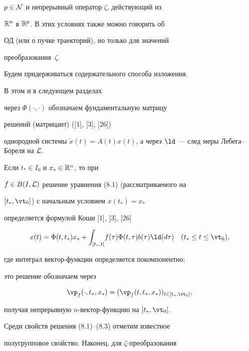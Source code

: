 $p \in {\cal N}$ и непрерывный оператор $\zeta$, действующий из


${\Bbb R}^n$ в ${{\Bbb R}^p}$. В этих условиях также можно говорить об


ОД (или о пучке траекторий), но только для значений


преобразования~$\zeta$.





Будем придерживаться содержательного способа изложения.


В этом и в следующем разделах


через ${\Phi}(\cdot,\cdot)$ обозначаем фундаментальную матрицу


решений (матрицант) ([1], [3], [26])


однородной системы $\Dot x(t) =


{A(t)}{x(t)}$, а через $\ld$ --- след меры Лебега--Бореля на ${\cal L}$.


Если ${t_*} \in {I_0}$ и ${x_*} \in {{\Bbb R}^n}$, то при


$f \in B(I,{\cal L})$ решение уравнения (8.1) (рассматриваемого на


$[{t_*},{{\vt}_0}]$) с начальным условием ${x(t_*)} = {x_*}$


определяется формулой Коши [1], [3], [26]


\begin{equation}


{x(t)} = {\Phi}(t,{t_*}){x_*} +


{\int_{[{t_*},t[}}{f(\tau)}{\Phi}(t,\tau){b(\tau)}{\ld}(d\tau)\quad


({t_*} \le t \le {{\vt}_0}),


\end{equation}


где интеграл вектор-функции определяется покомпонентно;


это решение обозначаем через


\begin{equation}


{{\vp}_f}(\cdot,{t_*},{x_*}) =


({{\vp}_f}(t,{t_*},{x_*}))_{t \in [{t_*},{{\vt}_0}]},


\end{equation}


получая непрерывную $n$-вектор-функцию на $[{t_*},{{\vt}_0}]$.


Среди свойств решения (8.1)--(8.3) отметим известное


полугрупповое свойство. Наконец, для $\zeta$-преобразования


